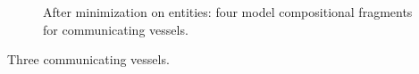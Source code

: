 \documentclass{article} %
\begin{document}
\begin{figure}[ht]
{}

\caption{After minimization on entities: four model compositional fragments for communicating vessels.}
\label{cv_frags}
\end{figure}

Three communicating vessels.
\end{document}
